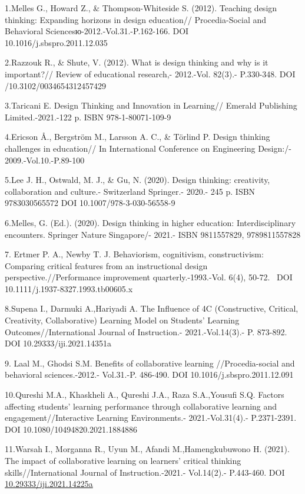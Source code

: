 \begin{references}
1.Melles G., Howard Z., \& Thompson-Whiteside S. (2012). Teaching design
thinking: Expanding horizons in design education// Procedia-Social and
Behavioral Sciencesю-2012.-Vol.31.-P.162-166. DOI\\
10.1016/j.sbspro.2011.12.035

2.Razzouk R., \& Shute, V. (2012). What is design thinking and why is it
important?// Review of educational research,- 2012.-Vol. 82(3).-
P.330-348. DOI /10.3102/0034654312457429

3.Taricani E. Design Thinking and Innovation in Learning// Emerald
Publishing Limited.-2021.-122 p. ISBN 978-1-80071-109-9

4.Ericson Å., Bergström M., Larsson A. C., \& Törlind P. Design thinking
challenges in education// In International Conference on Engineering
Design:/- 2009.-Vol.10.-P.89-100

5.Lee J. H., Ostwald, M. J., \& Gu, N. (2020). Design thinking:
creativity, collaboration and culture.- Switzerland Springer.- 2020.-
245 p. ISBN 9783030565572 DOI 10.1007/978-3-030-56558-9

6.Melles, G. (Ed.). (2020). Design thinking in higher education:
Interdisciplinary encounters. Springer Nature Singapore/- 2021.- ISBN
9811557829, 9789811557828

7. Ertmer P. A., Newby T. J. Behaviorism, cognitivism, constructivism:
Comparing critical features from an instructional design
perspective.//Performance improvement quarterly.-1993.-Vol. 6(4), 50-72.
~DOI 10.1111/j.1937-8327.1993.tb00605.x

8.Supena I., Darmuki A.,Hariyadi A. The Influence of 4C (Constructive,
Critical, Creativity, Collaborative) Learning Model on
Students'{} Learning Outcomes//International Journal of
Instruction.- 2021.-Vol.14(3).- P. 873-892. DOI 10.29333/iji.2021.14351a

9. Laal M., Ghodsi S.M. Benefits of collaborative learning
//Procedia-social and behavioral sciences.-2012.- Vol.31.-P. 486-490.
DOI 10.1016/j.sbspro.2011.12.091

10.Qureshi M.A., Khaskheli A., Qureshi J.A., Raza S.A.,Yousufi S.Q.
Factors affecting students' learning performance through collaborative
learning and engagement//Interactive Learning Environments.-
2021.-Vol.31(4).- P.2371-2391. DOI 10.1080/10494820.2021.1884886

11.Warsah I., Morganna R., Uyun M., Afandi M.,Hamengkubuwono H. (2021).
The impact of collaborative learning on learners' critical thinking
skills//International Journal of Instruction.-2021.- Vol.14(2).-
P.443-460. DOI
\href{http://dx.doi.org/10.29333/iji.2021.14225a}{10.29333/iji.2021.14225a}


\end{references}
